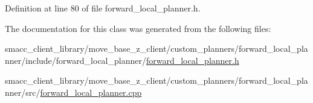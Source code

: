 Definition at line 80 of file forward\+\_\+local\+\_\+planner.\+h.



The documentation for this class was generated from the following files\+:\begin{DoxyCompactItemize}
\item 
smacc\+\_\+client\+\_\+library/move\+\_\+base\+\_\+z\+\_\+client/custom\+\_\+planners/forward\+\_\+local\+\_\+planner/include/forward\+\_\+local\+\_\+planner/\hyperlink{forward__local__planner_8h}{forward\+\_\+local\+\_\+planner.\+h}\item 
smacc\+\_\+client\+\_\+library/move\+\_\+base\+\_\+z\+\_\+client/custom\+\_\+planners/forward\+\_\+local\+\_\+planner/src/\hyperlink{forward__local__planner_8cpp}{forward\+\_\+local\+\_\+planner.\+cpp}\end{DoxyCompactItemize}
